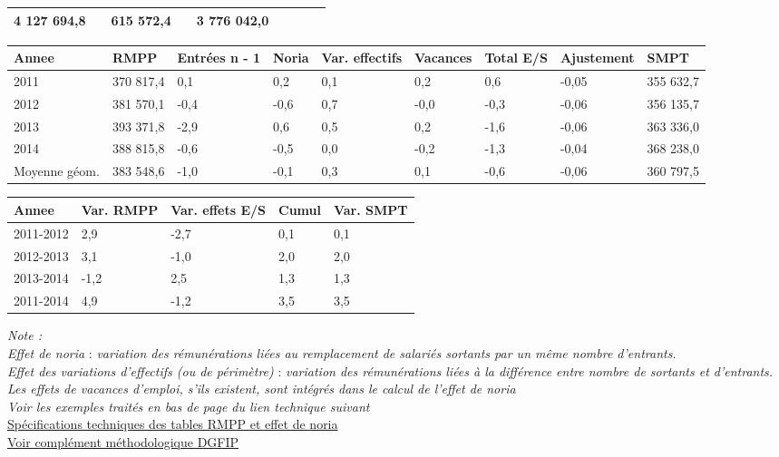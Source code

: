 \begin{longtable}[]{@{}lllllllll@{}}
\begin{minipage}[t]{0.16\columnwidth}
4 127 694,8\strut
\end{minipage} & \begin{minipage}[t]{0.06\columnwidth}\raggedright
\strut
\end{minipage} & \begin{minipage}[t]{0.12\columnwidth}\raggedright
615 572,4\strut
\end{minipage} & \begin{minipage}[t]{0.06\columnwidth}\raggedright
\strut
\end{minipage} & \begin{minipage}[t]{0.10\columnwidth}\raggedright
3 776 042,0\strut
\end{minipage} & \begin{minipage}[t]{0.06\columnwidth}\raggedright
\strut
\end{minipage}\tabularnewline
\bottomrule
\end{longtable}

\begin{longtable}[]{@{}lllllllll@{}}
\toprule
Annee & RMPP & Entrées n - 1 & Noria & Var. effectifs & Vacances & Total
E/S & Ajustement & SMPT\tabularnewline
\midrule
\endhead
2011 & 370 817,4 & 0,1 & 0,2 & 0,1 & 0,2 & 0,6 & -0,05 & 355
632,7\tabularnewline
2012 & 381 570,1 & -0,4 & -0,6 & 0,7 & -0,0 & -0,3 & -0,06 & 356
135,7\tabularnewline
2013 & 393 371,8 & -2,9 & 0,6 & 0,5 & 0,2 & -1,6 & -0,06 & 363
336,0\tabularnewline
2014 & 388 815,8 & -0,6 & -0,5 & 0,0 & -0,2 & -1,3 & -0,04 & 368
238,0\tabularnewline
Moyenne géom. & 383 548,6 & -1,0 & -0,1 & 0,3 & 0,1 & -0,6 & -0,06 & 360
797,5\tabularnewline
\bottomrule
\end{longtable}

\begin{longtable}[]{@{}lllll@{}}
\toprule
Annee & Var. RMPP & Var. effets E/S & Cumul & Var. SMPT\tabularnewline
\midrule
\endhead
2011-2012 & 2,9 & -2,7 & 0,1 & 0,1\tabularnewline
2012-2013 & 3,1 & -1,0 & 2,0 & 2,0\tabularnewline
2013-2014 & -1,2 & 2,5 & 1,3 & 1,3\tabularnewline
2011-2014 & 4,9 & -1,2 & 3,5 & 3,5\tabularnewline
\bottomrule
\end{longtable}

\emph{Note :}\\
\emph{Effet de noria} : \emph{variation des rémunérations liées au
remplacement de salariés sortants par un même nombre d'entrants.}\\
\emph{Effet des variations d'effectifs (ou de périmètre)} :
\emph{variation des rémunérations liées à la différence entre nombre de
sortants et d'entrants.}\\
\emph{Les effets de vacances d'emploi, s'ils existent, sont intégrés
dans le calcul de l'effet de noria}\\
\emph{Voir les exemples traités en bas de page du lien technique
suivant}\\
\href{../Docs/Notices/noria.html}{Spécifications techniques des tables RMPP
et effet de noria}\\
\href{../Docs/Notices/GVT\%20et\%20noria.pdf}{Voir complément
méthodologique DGFIP}


